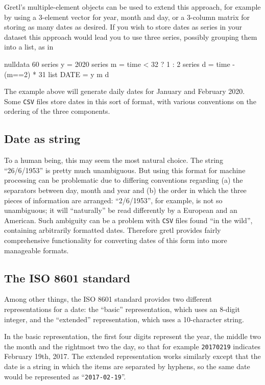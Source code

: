 Gretl's multiple-element objects can be used to extend this approach,
for example by using a 3-element vector for year, month and day, or a
3-column matrix for storing as many dates as desired. If you wish to
store dates as series in your dataset this approach would lead you to
use three series, possibly grouping them into a list, as in
\begin{code}
  nulldata 60
  series y = 2020
  series m = time < 32 ? 1 : 2
  series d = time - (m==2) * 31
  list DATE = y m d
\end{code}
The example above will generate daily dates for January and February
2020. Some \texttt{CSV} files store dates in this sort of format, with
various conventions on the ordering of the three components.

\subsection{Date as string}
\label{sec:cal-generic-string}

To a human being, this may seem the most natural choice.  The string
``26/6/1953'' is pretty much unambiguous. But using this format for
machine processing can be problematic due to differing conventions
regarding (a) the separators between day, month and year and (b) the
order in which the three pieces of information are arranged:
``2/6/1953'', for example, is not so unambiguous; it will
``naturally'' be read differently by a European and an American. Such
ambiguity can be a problem with \texttt{CSV} files found ``in the
wild'', containing arbitrarily formatted dates. Therefore gretl
provides fairly comprehensive functionality for converting dates of
this form into more manageable formats.

\subsection{The ISO 8601 standard}
\label{sec:cal-ISO8601}

Among other things, the ISO 8601 standard provides two different
representations for a date: the ``basic'' representation, which uses
an 8-digit integer, and the ``extended'' representation, which uses a
10-character string.

In the basic representation, the first four digits represent the year,
the middle two the month and the rightmost two the day, so that for
example \texttt{20170219} indicates February 19th, 2017. The extended
representation works similarly except that the date is a string in
which the items are separated by hyphens, so the same date would be
represented as ``\texttt{2017-02-19}''.

